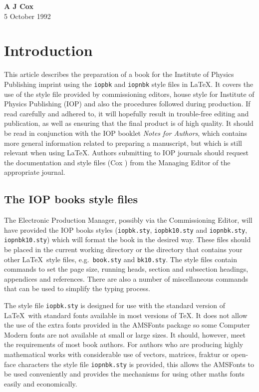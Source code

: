 \bigskip
\begin{flushright}
{\bf A J Cox}\\
5 October 1992
\end{flushright}
\newpage

\setcounter{page}{1}

\chapter{Introduction}
This article describes the preparation of a book for the Institute of 
Physics Publishing imprint
using the \verb"iopbk" and
\verb"iopnbk" style files in  \LaTeX.
It covers the use of the style file provided by 
commissioning editors, house style for Institute of Physics Publishing 
(IOP) and also the procedures 
followed during production. If read carefully and adhered to, it will 
hopefully result in trouble-free editing and publication, as well as 
ensuring that the final product is of high quality. It should be read 
in conjunction with the IOP booklet {\it Notes for Authors\/}, 
which contains more general information related to preparing a 
manuscript, but which is still relevant when using \LaTeX. Authors 
submitting to IOP journals should request the 
documentation and style files (Cox )  from the Managing 
Editor of the appropriate
journal.

\section{The IOP books style files}
The Electronic Production 
Manager, possibly via the Commissioning Editor, 
will have provided the IOP books styles
(\verb"iopbk.sty", \verb"iopbk10.sty" and \verb"iopnbk.sty",
\verb"iopnbk10.sty")
which will format the book in the desired way. 
These files should be placed in the current working directory or the
directory that contains your other
\LaTeX\ style files, e.g.\ \verb"book.sty" and \verb"bk10.sty". 
The style files  contain commands to 
set the page size, running heads, section and subsection headings, 
appendices and references. There are also a number of miscellaneous 
commands that can be used to simplify the typing process. 

The style file \verb"iopbk.sty" 
is designed for use with the standard
version of \LaTeX\ with standard fonts available in most versions of
\TeX. It does not allow the use of the extra fonts provided in the
AMSFonts 
package so some Computer Modern fonts are not available at small
or large sizes. It should, however, meet the requirements of
most book authors. For authors who are producing highly mathematical works
with considerable use of vectors, matrices, fraktur or 
open-face characters the style
file \verb"iopnbk.sty" is provided, this allows the AMSFonts to be used
conveniently and provides the mechanisms for using other maths fonts
easily and economically.
  
